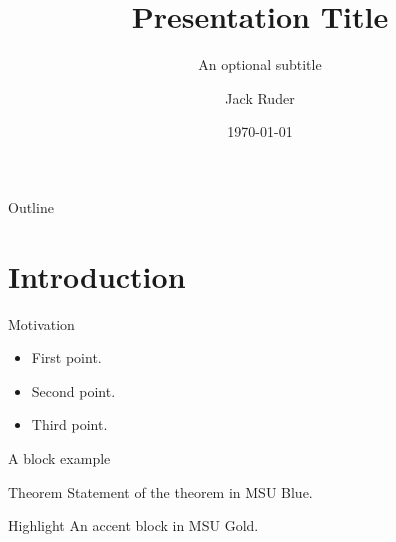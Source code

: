 \documentclass[presentation,aspectratio=169]{beamer}
\title{Presentation Title}
\subtitle{An optional subtitle}
\author{Jack Ruder}
\institute{Montana State University}
\date{\today}
\begin{document}
\begin{frame}[plain]
  \titlepage
\end{frame}

\begin{frame}{Outline}
  \tableofcontents
\end{frame}

\section{Introduction}

\begin{frame}{Motivation}
  \begin{itemize}
    \item First point.
    \item Second point.
    \item Third point.
  \end{itemize}
\end{frame}

\begin{frame}{A block example}
  \begin{block}{Theorem}
    Statement of the theorem in MSU Blue.
  \end{block}
  \begin{alertblock}{Highlight}
    An accent block in MSU Gold.
  \end{alertblock}
\end{frame}
\end{document}
